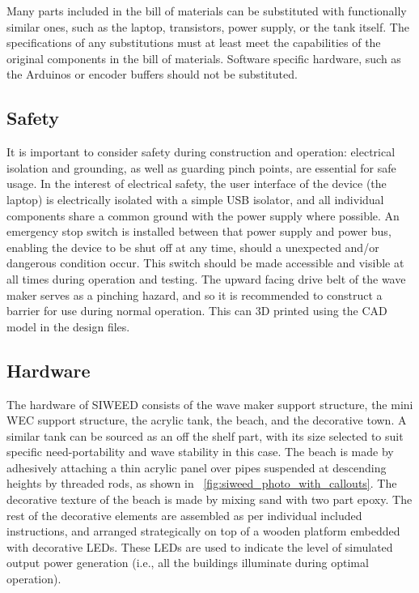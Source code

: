 \documentclass[hardware,article,submit,pdftex,moreauthors]{Definitions/mdpi}
\begin{document}

\begin{landscape}
\begingroup
\footnotesize
\renewcommand{\dtldisplaystarttab}{\\\toprule}%
\renewcommand\dtldisplayafterhead{\hline}%
\renewcommand\dtldisplaystartrow{\hline}%
\renewcommand{\dtldisplayendtab}{\\\bottomrule}%

\end{landscape}
\endgroup

Many parts included in the bill of materials can be substituted with functionally similar ones, such as the laptop, transistors, power supply, or the tank itself.
The specifications of any substitutions must at least meet the capabilities of the original components in the bill of materials.
Software specific hardware, such as the Arduinos or encoder buffers should not be substituted. 

\subsection{Safety}
It is important to consider safety during construction and operation: electrical isolation and grounding, as well as guarding pinch points, are essential for safe usage.
In the interest of electrical safety, the user interface of the device (the laptop) is electrically isolated with a simple USB isolator, and all individual components share a common ground with the power supply where possible. 
An emergency stop switch is installed between that power supply and power bus, enabling the device to be shut off at any time, should a unexpected and/or dangerous condition occur.
This switch should be made accessible and visible at all times during operation and testing.
The upward facing drive belt of the wave maker serves as a pinching hazard, and so it is recommended to construct a barrier for use during normal operation.
This can 3D printed using the CAD model in the design files.

\subsection{Hardware}
The hardware of SIWEED consists of the wave maker support structure, the mini WEC support structure, the acrylic tank, the beach, and the decorative town. 
A similar tank can be sourced as an off the shelf part, with its size selected to suit specific need-portability and wave stability in this case. 
The beach is made by adhesively attaching a thin acrylic panel over pipes suspended at descending heights by threaded rods, as shown in \figurename~\ref{fig:siweed_photo_with_callouts}.
The decorative texture of the beach is made by mixing sand with two part epoxy.
The rest of the decorative elements are assembled as per individual included instructions, and arranged strategically on top of a wooden platform embedded with decorative LEDs. 
These LEDs are used to indicate the level of simulated output power generation (i.e., all the buildings illuminate during optimal operation).
\end{document}
